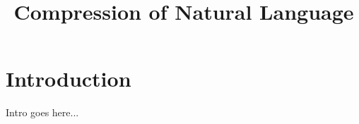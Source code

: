 \documentclass[12pt,a4paper]{article}
\title{\vspace*{\fill}\huge Compression of Natural Language \vspace*{\fill}}
\date{}
\begin{document}
\maketitle

\thispagestyle{fancy}  %

\newpage
\section{Introduction}
Intro goes here...
\end{document}
